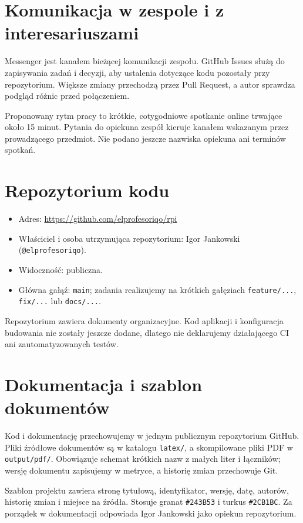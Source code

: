 \documentclass[11pt,a4paper]{article}
\begin{document}
\section{Komunikacja w zespole i z interesariuszami}
Messenger jest kanałem bieżącej komunikacji zespołu. GitHub Issues służą do zapisywania zadań i decyzji, aby ustalenia dotyczące kodu pozostały przy repozytorium. Większe zmiany przechodzą przez Pull Request, a autor sprawdza podgląd różnic przed połączeniem.

Proponowany rytm pracy to krótkie, cotygodniowe spotkanie online trwające około 15 minut. Pytania do opiekuna zespół kieruje kanałem wskazanym przez prowadzącego przedmiot. Nie podano jeszcze nazwiska opiekuna ani terminów spotkań.

\section{Repozytorium kodu}
\begin{itemize}
  \item Adres: \url{https://github.com/elprofesoriqo/rpi}
  \item Właściciel i osoba utrzymująca repozytorium: Igor Jankowski (\texttt{@elprofesoriqo}).
  \item Widoczność: publiczna.
  \item Główna gałąź: \texttt{main}; zadania realizujemy na krótkich gałęziach \texttt{feature/...}, \texttt{fix/...} lub \texttt{docs/...}.
\end{itemize}

Repozytorium zawiera dokumenty organizacyjne. Kod aplikacji i konfiguracja budowania nie zostały jeszcze dodane, dlatego nie deklarujemy działającego CI ani zautomatyzowanych testów.

\section{Dokumentacja i szablon dokumentów}
Kod i dokumentację przechowujemy w jednym publicznym repozytorium GitHub. Pliki źródłowe dokumentów są w katalogu \texttt{latex/}, a skompilowane pliki PDF w \texttt{output/pdf/}. Obowiązuje schemat krótkich nazw z małych liter i łączników; wersję dokumentu zapisujemy w metryce, a historię zmian przechowuje Git.

Szablon projektu zawiera stronę tytułową, identyfikator, wersję, datę, autorów, historię zmian i miejsce na źródła. Stosuje granat \texttt{\#243B53} i turkus \texttt{\#2CB1BC}. Za porządek w dokumentacji odpowiada Igor Jankowski jako opiekun repozytorium.
\end{document}
